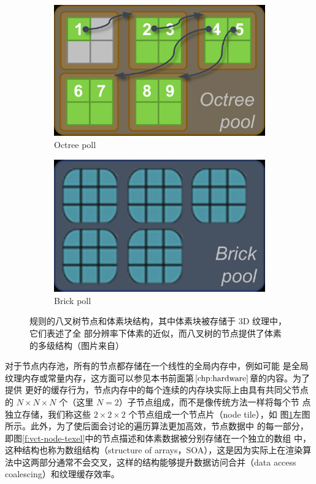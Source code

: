 \begin{figure}
\begin{center}
	\begin{subfigure}[b]{0.4\textwidth}
		\includegraphics[width=\textwidth]{figures/vct/vct-13-8}
		\caption{Octree poll}
	\end{subfigure}
	\begin{subfigure}[b]{0.4\textwidth}
		\includegraphics[width=\textwidth]{figures/vct/vct-13-9}
		\caption{Brick poll}
	\end{subfigure}
\end{center}
	\caption{规则的八叉树节点和体素块结构，其中体素块被存储于 3D 纹理中，它们表述了全 部分辨率下体素的近似，而八叉树的节点提供了体素的多级结构（图片来自\cite{a:Gigavoxels:Avoxelbasedrenderingpipelineforefficientexplorationoflargeanddetailedscenes}）}
	\label{f:vct-pools}
\end{figure}

对于节点内存池，所有的节点都存储在一个线性的全局内存中，例如可能 是全局纹理内存或常量内存，这方面可以参见本书前面第$\ref{chp:hardware}$章的内容。为了提供 更好的缓存行为，节点内存中的每个连续的内存块实际上由具有共同父节点的 $N\times N\times N$ 个（这里 $N = 2$）子节点组成，而不是像传统方法一样将每个节 点独立存储，我们称这些 $2\times 2\times 2$ 个节点组成一个节点片（node tile），如 图\ref{f:vct-pools}左图所示。此外，为了使后面会讨论的遍历算法更加高效，节点数据中 的每一部分，即图\ref{f:vct-node-texel}中的节点描述和体素数据被分别存储在一个独立的数组 中，这种结构也称为数组结构（structure of arrays，SOA），这是因为实际上在渲染算法中这两部分通常不会交叉，这样的结构能够提升数据访问合并（data access coalescing）和纹理缓存效率。

